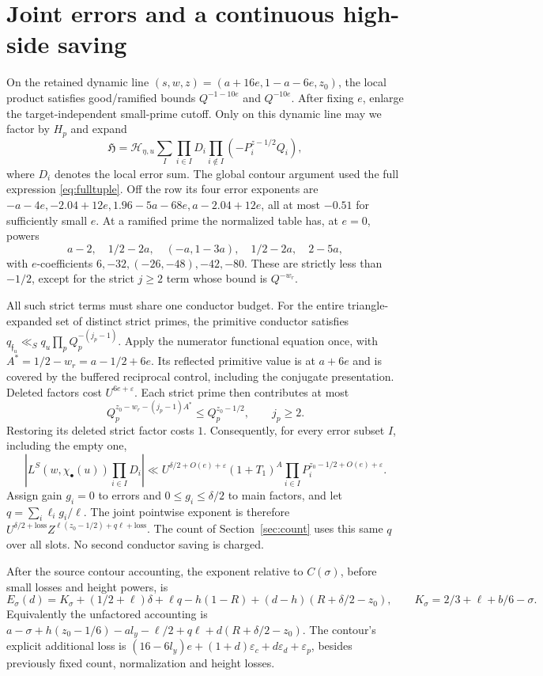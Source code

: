 \documentclass[11pt,a4paper]{article}
\theoremstyle{definition}
\newcommand{\eps}{\varepsilon}
\newcommand{\HH}{\mathfrak H}
\begin{document}
\section{Joint errors and a continuous high-side saving}
\label{sec:high}
On the retained dynamic line
$(s,w,z)=(a+16e,1-a-6e,z_0)$,
the local product satisfies good/ramified bounds
$Q^{-1-10e}$ and $Q^{-10e}$.
After fixing $e$, enlarge the target-independent small-prime cutoff.
Only on this dynamic line may we factor by $H_p$ and expand
\[
 \HH=\mathcal H_{\eta,u}
       \sum_I\prod_{i\in I}D_i\prod_{i\notin I}
                       (-P_i^{z-1/2}Q_i),
\]
where $D_i$ denotes the local error sum. The global contour
argument used the full expression \eqref{eq:fulltuple}.
Off the row its four error exponents are
$-a-4e,-2.04+12e,1.96-5a-68e,a-2.04+12e$,
all at most $-0.51$ for sufficiently small $e$.
At a ramified prime the normalized table has, at $e=0$, powers
\[
 a-2,\quad 1/2-2a,\quad (-a,1-3a),\quad
 1/2-2a,\quad 2-5a ,
\]
with $e$-coefficients $6,-32,(-26,-48),-42,-80$.
These are strictly less than $-1/2$, except for the strict
$j\ge2$ term whose bound is $Q^{-w_r}$.

All such strict terms must share one conductor budget.
For the entire triangle-expanded set of distinct strict primes,
the primitive conductor satisfies
$q_{\mathfrak f_u}\ll_S q_u\prod_p Q_p^{-(j_p-1)}$.
Apply the numerator functional equation once, with
$A^*=1/2-w_r=a-1/2+6e$. Its reflected primitive value is at
$a+6e$ and is covered by the buffered reciprocal control,
including the conjugate presentation. Deleted factors cost
$U^{6e+\eps}$. Each strict prime then contributes at most
\[
 Q_p^{z_0-w_r-(j_p-1)A^*}\le Q_p^{z_0-1/2},
 \qquad j_p\ge2.
\]
Restoring its deleted strict factor costs $1$.
Consequently, for every error subset $I$, including the empty one,
\[
 \left|L^S(w,\chi_\bullet(u))\prod_{i\in I}D_i\right|
 \ll U^{\delta/2+O(e)+\eps}(1+T_1)^A
       \prod_{i\in I}P_i^{z_0-1/2+O(e)+\eps}.
\]
Assign gain $g_i=0$ to errors and $0\le g_i\le\delta/2$ to
main factors, and let $q=\sum_i\ell_i g_i/\ell$.
The joint pointwise exponent is therefore
$U^{\delta/2+\mathrm{loss}}Z^{\ell(z_0-1/2)+q\ell+\mathrm{loss}}$.
The count of Section~\ref{sec:count} uses this same $q$ over
all slots. No second conductor saving is charged.

After the source contour accounting, the exponent relative to
$C(\sigma)$, before small losses and height powers, is
\begin{equation}\label{eq:E}
 E_\sigma(d)=K_\sigma+(1/2+\ell)\delta+\ell q
       -h(1-R)+(d-h)(R+\delta/2-z_0),
 \qquad K_\sigma=2/3+\ell+b/6-\sigma .
\end{equation}
Equivalently the unfactored accounting is
$a-\sigma+h(z_0-1/6)-a l_y-\ell/2+q\ell+
d(R+\delta/2-z_0)$.
The contour's explicit additional loss is
$(16-6l_y)e+(1+d)\eps_c+d\eps_d+\eps_p$,
besides previously fixed count, normalization and height losses.
\end{document}
